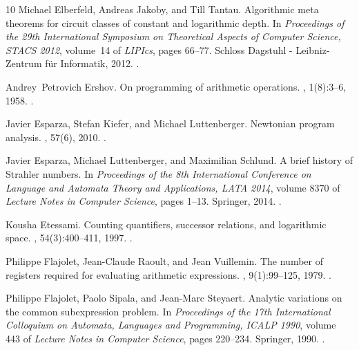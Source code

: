 \documentclass[a4paper,UKenglish,cleveref, autoref, thm-restate, numberwithinsect]{lipics-v2021}
\begin{document}
\begin{thebibliography}{10}
Michael Elberfeld, Andreas Jakoby, and Till Tantau.
\newblock Algorithmic meta theorems for circuit classes of constant and
  logarithmic depth.
\newblock In {\em Proceedings of the 29th International Symposium on
  Theoretical Aspects of Computer Science, {STACS} 2012}, volume~14 of {\em
  LIPIcs}, pages 66--77. Schloss Dagstuhl - Leibniz-Zentrum f{\"{u}}r
  Informatik, 2012.
\newblock \href {https://doi.org/10.4230/LIPICS.STACS.2012.66}
  {}.

Andrey~Petrovich Ershov.
\newblock On programming of arithmetic operations.
, 1(8):3--6, 1958.
\newblock \href {https://doi.org/10.1145/368892.368907}
  {}.

Javier Esparza, Stefan Kiefer, and Michael Luttenberger.
\newblock Newtonian program analysis.
, 57(6), 2010.
\newblock \href {https://doi.org/10.1145/1857914.1857917}
  {}.

Javier Esparza, Michael Luttenberger, and Maximilian Schlund.
\newblock A brief history of {Strahler} numbers.
\newblock In {\em Proceedings of the 8th International Conference on Language
  and Automata Theory and Applications, {LATA} 2014}, volume 8370 of {\em
  Lecture Notes in Computer Science}, pages 1--13. Springer, 2014.
\newblock \href {https://doi.org/10.1007/978-3-319-04921-2\_1}
  {}.

Kousha Etessami.
\newblock Counting quantifiers, successor relations, and logarithmic space.
, 54(3):400--411, 1997.
\newblock \href {https://doi.org/10.1006/JCSS.1997.1485}
  {}.

Philippe Flajolet, Jean{-}Claude Raoult, and Jean Vuillemin.
\newblock The number of registers required for evaluating arithmetic
  expressions.
, 9(1):99--125, 1979.
\newblock \href {https://doi.org/10.1016/0304-3975(79)90009-4}
  {}.

Philippe Flajolet, Paolo Sipala, and Jean{-}Marc Steyaert.
\newblock Analytic variations on the common subexpression problem.
\newblock In {\em Proceedings of the 17th International Colloquium on Automata,
  Languages and Programming, ICALP 1990}, volume 443 of {\em Lecture Notes in
  Computer Science}, pages 220--234. Springer, 1990.
\newblock \href {https://doi.org/10.1007/BFB0032034}
  {}.


\end{thebibliography}
\end{document}
